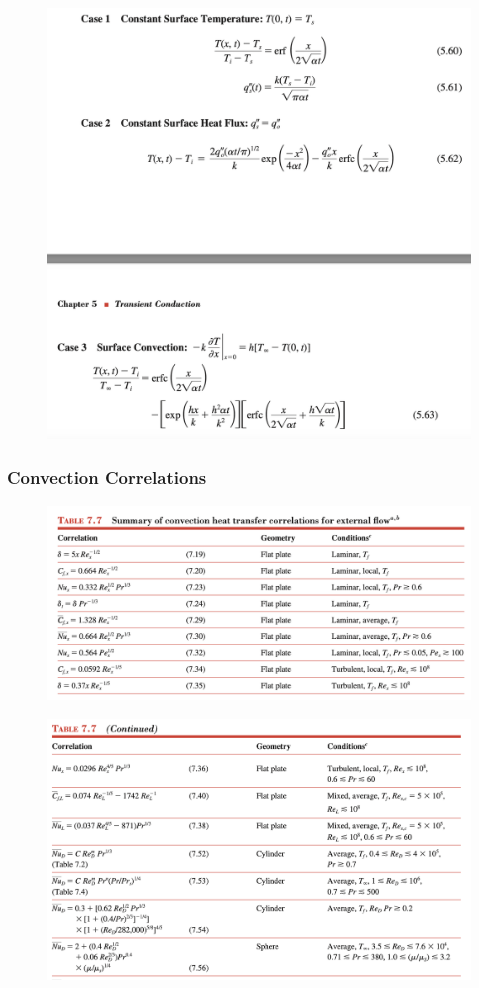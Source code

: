 \documentclass[12pt,letterpaper]{article}
\begin{document}
\begin{figure}[!htpb]
    \centering
    \includegraphics[width=0.95\linewidth]{./image54.png}
\end{figure}


\clearpage
\subsubsection*{Convection Correlations}

\begin{figure}[!htpb]
    \centering
    \includegraphics[width=0.95\linewidth]{./image70.png}
\end{figure}

\begin{figure}[!htpb]
    \centering
    \includegraphics[width=0.95\linewidth]{./image71.png}
\end{figure}
\end{document}
